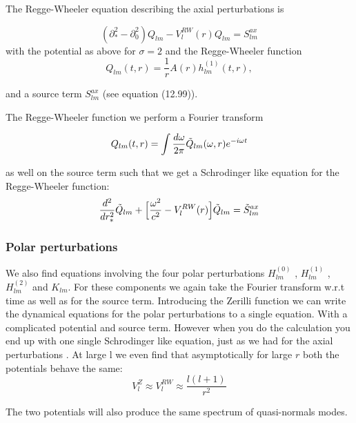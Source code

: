 \documentclass[12 pt]{article}
\begin{document}
	The Regge-Wheeler equation describing the axial perturbations is
	
	\begin{equation}
		(\partial_*^2 - \partial_0^2)Q_{lm} - V_l^{RW}(r)Q_{lm} = S_{lm}^{ax}
	\end{equation}
	with the potential as above for $\sigma = 2$ and the Regge-Wheeler function 
	\begin{equation}
		Q_{lm}(t,r) = \frac{1}{r} A(r) h^{(1)}_{lm}(t,r),
	\end{equation}
	
	and a source term $S_{lm}^{ax}$ (see \cite{maggiore} equation (12.99)).
	
	The Regge-Wheeler function we perform a Fourier transform 
	
	\begin{equation}
		Q_{lm}(t,r) = \int \frac{d\omega}{2 \pi} \Tilde{Q}_{lm}(\omega ,r) e^{-i\omega t}
	\end{equation}
	
	as well on the source term such that we get a Schrodinger like equation for the Regge-Wheeler function:
	\begin{equation}
		\frac{d^2}{dr_*^2}\Tilde{Q}_{lm} + \Big[\frac{\omega^2}{c^2} - V_l^{RW}(r) \Big] \Tilde{Q}_{lm} = \Tilde{S}_{lm}^{ax}
	\end{equation}
	
	\subsubsection{Polar perturbations}
	
	We also find equations involving the four polar perturbations $H^{(0)}_{lm}$ , $H^{(1)}_{lm}$ , $H^{(2)}_{lm}$ and $K_{lm}$. For these components we again take the Fourier transform w.r.t time as well as for the source term. Introducing the Zerilli function we can write the dynamical equations for the polar perturbations to a single equation. With a complicated potential and source term. However when you do the calculation you end up with one single Schrodinger like equation, just as we had for the axial perturbations . At large l we even find that asymptotically for large $r$ both the potentials behave the same:
	\begin{equation}
		V_l^Z \approx V_l^{RW} \approx \frac{l(l+1)}{r^2}
	\end{equation}
	
	The two potentials will also produce the same spectrum of quasi-normals modes.
	
\end{document}

